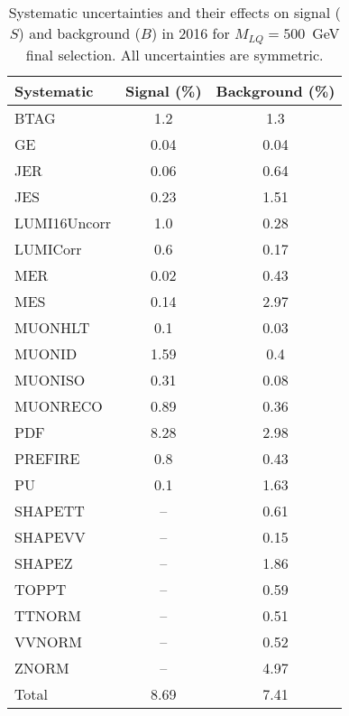 \begin{table}[htbp]
\begin{center}
\caption{Systematic uncertainties and their effects on signal ($S$) and background ($B$) in 2016 for $M_{LQ}=500$~GeV final selection. All uncertainties are symmetric.}
\begin{tabular}{lcc}
\hline\hline
Systematic & Signal (\%) & Background (\%) \\ \hline 
BTAG & 1.2 & 1.3\\ 
GE & 0.04 & 0.04\\ 
JER & 0.06 & 0.64\\ 
JES & 0.23 & 1.51\\ 
LUMI16Uncorr & 1.0 & 0.28\\ 
LUMICorr & 0.6 & 0.17\\ 
MER & 0.02 & 0.43\\ 
MES & 0.14 & 2.97\\ 
MUONHLT & 0.1 & 0.03\\ 
MUONID & 1.59 & 0.4\\ 
MUONISO & 0.31 & 0.08\\ 
MUONRECO & 0.89 & 0.36\\ 
PDF & 8.28 & 2.98\\ 
PREFIRE & 0.8 & 0.43\\ 
PU & 0.1 & 1.63\\ 
SHAPETT & -- & 0.61\\ 
SHAPEVV & -- & 0.15\\ 
SHAPEZ & -- & 1.86\\ 
TOPPT & -- & 0.59\\ 
TTNORM & -- & 0.51\\ 
VVNORM & -- & 0.52\\ 
ZNORM & -- & 4.97\\ 
Total & 8.69 & 7.41\\ \hline \hline
\end{tabular}
\label{tab:SysUncertainties_uujj_500}
\end{center}
\end{table}

